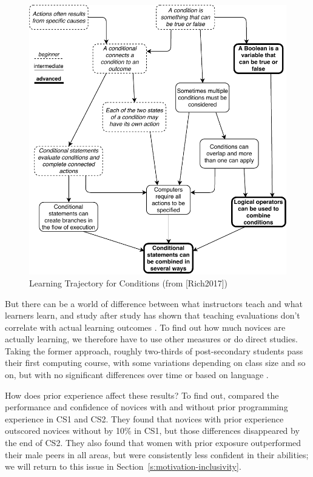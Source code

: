 \begin{figure}
\centering
\includegraphics{../../figures/conditionals.pdf}
\caption{Learning Trajectory for Conditions (from {[}Rich2017{]})}
\label{f:pck-trajectory}
\end{figure}

But there can be a world of difference between what instructors teach
and what learners learn, and study after study has shown that teaching
evaluations don't correlate with actual learning outcomes
\cite{Star2014,Uttl2017}. To find out how much novices are actually
learning, we therefore have to use other measures or do direct studies.
Taking the former approach, roughly two-thirds of post-secondary
students pass their first computing course, with some variations
depending on class size and so on, but with no significant differences
over time or based on language \cite{Benn2007a,Wats2014}.

How does prior experience affect these results? To find out,
\cite{Wilc2018} compared the performance and confidence of novices
with and without prior programming experience in CS1 and CS2. They found
that novices with prior experience outscored novices without by 10\% in
CS1, but those differences disappeared by the end of CS2. They also
found that women with prior exposure outperformed their male peers in
all areas, but were consistently less confident in their abilities; we
will return to this issue in Section~\ref{s:motivation-inclusivity}.

